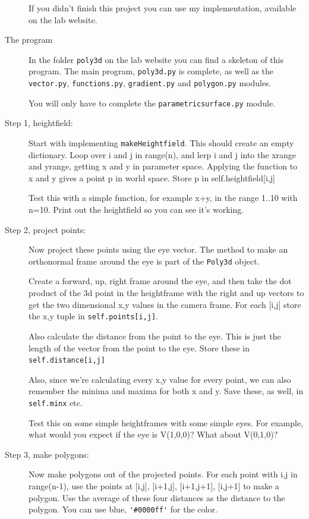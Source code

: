\documentclass[12pt]{article}
\begin{document}
\begin{description}
If you didn't finish this project you can use my implementation,
available on the lab website.

\item[The program]  In the folder \lstinline{poly3d} on the
lab website you can find a skeleton of this program.  The main
program, \lstinline{poly3d.py} is complete, as well as the 
\lstinline{vector.py}, \lstinline{functions.py}, \lstinline{gradient.py}
 and \lstinline{polygon.py}
modules.

You will only have to complete the \lstinline{parametricsurface.py} module.

\item[Step 1, heightfield:]  
Start with implementing \lstinline{makeHeightfield}.  
This should create an empty dictionary.  Loop over
i and j in range(n), and lerp i and j into the xrange 
and yrange, getting x and y in parameter space.
Applying the function to x and y gives a point p in world
space.  Store p in self.heightfield[i,j]

Test this with a simple function, for example x+y,
in the range 1..10 with n=10.  Print out the heightfield
so you can see it's working.

\item[Step 2, project points:] 
Now project these points using the eye vector.
The method to make an orthonormal frame around 
the eye is part of the \lstinline{Poly3d} object.

Create a forward, up, right frame around the eye,
and then take the dot product of the 3d point in the heightframe
with the right and up vectors to get the two dimensional
x,y values in the camera frame.  For each [i,j]
store the x,y tuple in \lstinline{self.points[i,j]}.

Also calculate the distance from the point to the eye.
This is just the length of the vector from the point to the eye.
Store these in \lstinline{self.distance[i,j]}

Also, since we're calculating every x,y value for every point,
we can also remember the minima and maxima for both
x and y.  Save these, as well, in \lstinline{self.minx} etc.

Test this on some simple heightframes with some simple
eyes.  For example, what would you expect if the eye 
is V(1,0,0)?  What about V(0,1,0)?

\item[Step 3, make polygons:]
Now make polygons out of the projected points.
For each point with i,j in range(n-1), use the points
at [i,j], [i+1,j], [i+1,j+1], [i,j+1] to make a polygon.
Use the average of these four distances as the
distance to the polygon.  You can use blue, \lstinline{'#0000ff'}
for the color.


\end{description}
\end{document}
